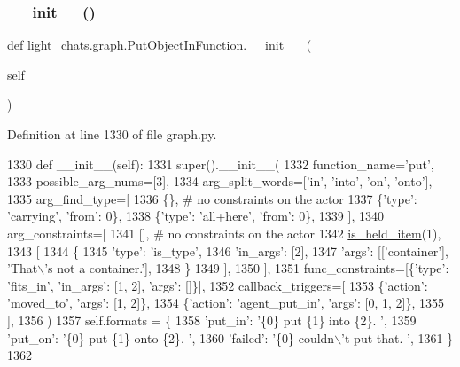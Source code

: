 \subsubsection{\texorpdfstring{\+\_\+\+\_\+init\+\_\+\+\_\+()}{\_\_init\_\_()}}
{\footnotesize\ttfamily def light\+\_\+chats.\+graph.\+Put\+Object\+In\+Function.\+\_\+\+\_\+init\+\_\+\+\_\+ (\begin{DoxyParamCaption}\item[{}]{self }\end{DoxyParamCaption})}



Definition at line 1330 of file graph.\+py.


\begin{DoxyCode}
1330     \textcolor{keyword}{def }\_\_init\_\_(self):
1331         super().\_\_init\_\_(
1332             function\_name=\textcolor{stringliteral}{'put'},
1333             possible\_arg\_nums=[3],
1334             arg\_split\_words=[\textcolor{stringliteral}{'in'}, \textcolor{stringliteral}{'into'}, \textcolor{stringliteral}{'on'}, \textcolor{stringliteral}{'onto'}],
1335             arg\_find\_type=[
1336                 \{\},  \textcolor{comment}{# no constraints on the actor}
1337                 \{\textcolor{stringliteral}{'type'}: \textcolor{stringliteral}{'carrying'}, \textcolor{stringliteral}{'from'}: 0\},
1338                 \{\textcolor{stringliteral}{'type'}: \textcolor{stringliteral}{'all+here'}, \textcolor{stringliteral}{'from'}: 0\},
1339             ],
1340             arg\_constraints=[
1341                 [],  \textcolor{comment}{# no constraints on the actor}
1342                 \hyperlink{namespacelight__chats_1_1graph_aa0be6ee7e9f549a7195bea9dfb962ad6}{is\_held\_item}(1),
1343                 [
1344                     \{
1345                         \textcolor{stringliteral}{'type'}: \textcolor{stringliteral}{'is\_type'},
1346                         \textcolor{stringliteral}{'in\_args'}: [2],
1347                         \textcolor{stringliteral}{'args'}: [[\textcolor{stringliteral}{'container'}], \textcolor{stringliteral}{'That\(\backslash\)'s not a container.'}],
1348                     \}
1349                 ],
1350             ],
1351             func\_constraints=[\{\textcolor{stringliteral}{'type'}: \textcolor{stringliteral}{'fits\_in'}, \textcolor{stringliteral}{'in\_args'}: [1, 2], \textcolor{stringliteral}{'args'}: []\}],
1352             callback\_triggers=[
1353                 \{\textcolor{stringliteral}{'action'}: \textcolor{stringliteral}{'moved\_to'}, \textcolor{stringliteral}{'args'}: [1, 2]\},
1354                 \{\textcolor{stringliteral}{'action'}: \textcolor{stringliteral}{'agent\_put\_in'}, \textcolor{stringliteral}{'args'}: [0, 1, 2]\},
1355             ],
1356         )
1357         self.formats = \{
1358             \textcolor{stringliteral}{'put\_in'}: \textcolor{stringliteral}{'\{0\} put \{1\} into \{2\}. '},
1359             \textcolor{stringliteral}{'put\_on'}: \textcolor{stringliteral}{'\{0\} put \{1\} onto \{2\}. '},
1360             \textcolor{stringliteral}{'failed'}: \textcolor{stringliteral}{'\{0\} couldn\(\backslash\)'t put that. '},
1361         \}
1362 
\end{DoxyCode}


